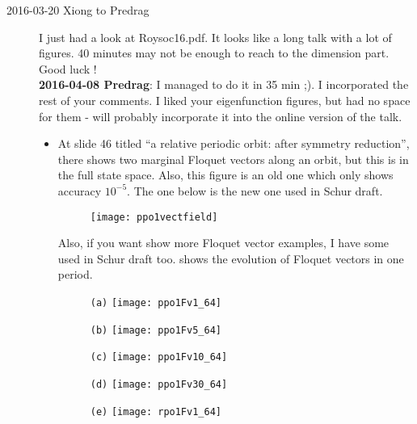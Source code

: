 \begin{description}
\item[2016-03-20 Xiong to Predrag]
  I just had a look at Roysoc16.pdf. It looks like a long talk with
  a lot of figures. 40 minutes may not be enough to reach to the
  dimension part. Good luck ! \\
  {\bf 2016-04-08 Predrag}: I managed to do it in 35 min ;).
  I incorporated the rest of your comments. I liked your eigenfunction
  figures, but had no space for them - will probably incorporate it
  into the online version of the talk.
  \begin{itemize}
  \item At slide 46 titled
    ``a relative periodic orbit: after symmetry reduction'',
    there shows two marginal Floquet vectors along an orbit, but this
    is in the full state space. Also, this figure is an old one which
    only shows accuracy $10^{-5}$.
    The one below is the new one used in Schur draft.
    \begin{figure}[h]
      \centering
      \texttt{[image: ppo1vectfield]}
    \end{figure}
    Also, if you want show more Floquet vector examples, I have some
    used in Schur draft too.  shows the evolution of
    Floquet vectors in one period.
    \begin{figure}[h]
      \centering
      \begin{minipage}{.115\textwidth}
        \centering \small{\texttt{(a)}}
        \texttt{[image: ppo1Fv1\_64]}
      \end{minipage}
      \begin{minipage}{.115\textwidth}
        \centering \small{\texttt{(b)}}
        \texttt{[image: ppo1Fv5\_64]}
      \end{minipage}
      \begin{minipage}{.115\textwidth}
        \centering \small{\texttt{(c)}}
        \texttt{[image: ppo1Fv10\_64]}
      \end{minipage}
      \begin{minipage}{.115\textwidth}
        \centering \small{\texttt{(d)}}
        \texttt{[image: ppo1Fv30\_64]}
      \end{minipage}
      \begin{minipage}{.115\textwidth}
        \centering \small{\texttt{(e)}}
        \texttt{[image: rpo1Fv1\_64]}
      \end{minipage}
      \begin{minipage}{.115\textwidth}

\end{minipage}
\end{figure}
\end{itemize}
\end{description}
